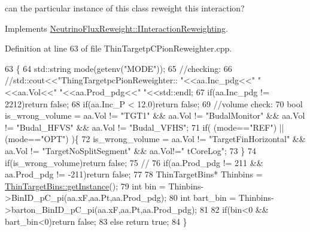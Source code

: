 can the particular instance of this class reweight this interaction? 



Implements \hyperlink{class_neutrino_flux_reweight_1_1_i_interaction_reweighting_aa3d1d3f37a93b02e447cf5eca333ac8d}{Neutrino\-Flux\-Reweight\-::\-I\-Interaction\-Reweighting}.



Definition at line 63 of file Thin\-Targetp\-C\-Pion\-Reweighter.\-cpp.


\begin{DoxyCode}
63                                                                        \{
64     std::string mode(getenv(\textcolor{stringliteral}{"MODE"}));
65     \textcolor{comment}{//checking:}
66     \textcolor{comment}{//std::cout<<"ThingTargetpcPionReweighter:: "<<aa.Inc\_pdg<<" "<<aa.Vol<<" "<<aa.Prod\_pdg<<"
       "<<std::endl;}
67     \textcolor{keywordflow}{if}(aa.Inc\_pdg != 2212)\textcolor{keywordflow}{return} \textcolor{keyword}{false};
68     \textcolor{keywordflow}{if}(aa.Inc\_P < 12.0)\textcolor{keywordflow}{return} \textcolor{keyword}{false};
69     \textcolor{comment}{//volume check: }
70     \textcolor{keywordtype}{bool} is\_wrong\_volume = aa.Vol != \textcolor{stringliteral}{"TGT1"} && aa.Vol != \textcolor{stringliteral}{"BudalMonitor"} && aa.Vol != \textcolor{stringliteral}{"Budal\_HFVS"} && aa.Vol
       != \textcolor{stringliteral}{"Budal\_VFHS"};
71     \textcolor{keywordflow}{if}( (mode==\textcolor{stringliteral}{"REF"}) || (mode==\textcolor{stringliteral}{"OPT"}) )\{
72       is\_wrong\_volume = aa.Vol != \textcolor{stringliteral}{"TargetFinHorizontal"} && aa.Vol != \textcolor{stringliteral}{"TargetNoSplitSegment"} && aa.Vol!=\textcolor{stringliteral}{"
      tCoreLog"};
73     \}
74     \textcolor{keywordflow}{if}(is\_wrong\_volume)\textcolor{keywordflow}{return} \textcolor{keyword}{false};
75     \textcolor{comment}{//}
76     \textcolor{keywordflow}{if}(aa.Prod\_pdg != 211 && aa.Prod\_pdg != -211)\textcolor{keywordflow}{return} \textcolor{keyword}{false};
77     
78     ThinTargetBins*  Thinbins =  \hyperlink{class_neutrino_flux_reweight_1_1_thin_target_bins_aeff5cf7220dd08322f5abac2cbc7ff33}{ThinTargetBins::getInstance}();
79     \textcolor{keywordtype}{int} bin      = Thinbins->BinID\_pC\_pi(aa.xF,aa.Pt,aa.Prod\_pdg);
80     \textcolor{keywordtype}{int} bart\_bin = Thinbins->barton\_BinID\_pC\_pi(aa.xF,aa.Pt,aa.Prod\_pdg);
81     
82     \textcolor{keywordflow}{if}(bin<0 && bart\_bin<0)\textcolor{keywordflow}{return} \textcolor{keyword}{false};
83     \textcolor{keywordflow}{else} \textcolor{keywordflow}{return} \textcolor{keyword}{true};
84   \}
\end{DoxyCode}


